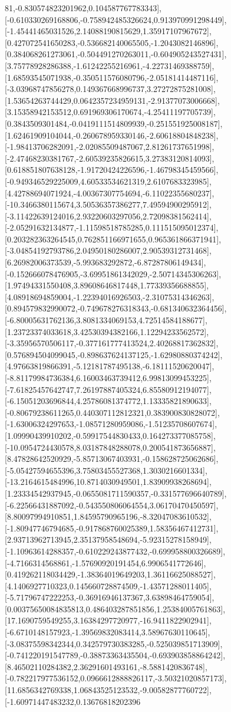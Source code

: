 \documentclass{article}
\begin{document}
81,-0.830574823201962,0.104587767783343],[-0.610330269168806,-0.758942485326624,0.913970991298449],[-1.45441465031526,2.14088190815629,1.35917107967672],[0.427072541650283,-0.536682140065505,-1.2043082146896],[0.384068261273061,-0.504491270263011,-0.604905243527431],[3.75778928286388,-1.61242255216961,-4.22731469388759],[1.68593545071938,-0.350511576080796,-2.05181414487116],[-3.03968747856278,0.149367668996737,3.27272875281008],[1.53654263744429,0.0642357234959131,-2.91377073006668],[3.15358942153512,0.691969306170674,-4.25411197705739],[0.3843509301484,-0.0419111514809939,-0.251551925008187],[1.62461909104044,-0.260678959330146,-2.60618804848238],[-1.98413706282091,-2.02085509487067,2.81261737651998],[-2.47468230381767,-2.60539235826615,3.27383120814093],[0.618851807638128,-1.91720424226596,-1.46798345459566],[-0.949346529225009,4.60533534621319,2.6107683323985],[4.42788694071924,-4.00367307754694,-6.11022355680237],[-10.3466380115674,3.50536357386277,7.49594900295912],[-3.11422639124016,2.93220603297056,2.72098381562414],[-2.05291632134877,-1.11598518785285,0.111515095012374],[0.203282363264545,0.762851166971655,0.965361866371941],[-3.04854192793786,2.04950180286007,2.90539312731468],[6.26982006373539,-5.993683292872,-6.87287806149434],[-0.152666078476905,-3.69951861342029,-2.50714345306263],[1.97494331550408,3.89608646817448,1.77339356688855],[4.08918694859004,-1.22394016926503,-2.31075314346263],[0.894579832990072,-0.749678276318343,-0.681340632364456],[-6.80005631762136,3.8081334069153,4.72514584188677],[1.23723374033618,3.42530394382166,1.12294233562572],[-3.35956570506117,-0.377161777413524,2.40268817362832],[0.576894504099045,-0.898637624137125,-1.62980880374242],[4.97663819866391,-5.12181787495138,-6.18111520620047],[-8.81179984736384,6.16003463739412,6.99813099453225],[-7.61825457642747,7.26197887405324,6.85580912194077],[-6.15051203696844,4.25786081374772,1.13335821890633],[-0.80679238611265,0.440307112812321,0.383900830828072],[-1.63006324297653,-1.08571280959086,-1.51235708607674],[1.09990439910202,-0.59917544830433,0.164273377085758],[-10.0954724430578,8.03187848288078,0.200541873656887],[8.47828642520929,-5.85713067403931,-0.158628725062686],[-5.05427594655396,3.75803455527368,1.3030216601334],[-13.2164615484996,10.8714030949501,1.83909938268694],[1.23334542937945,-0.0655081711590357,-0.331577696640789],[-6.22566431887092,-0.543550806064554,3.06170470450597],[8.80097994910851,1.84595790965196,-8.32047083610532],[-1.80947746794685,-0.917868760025389,1.58356467412731],[2.93713962713945,2.35137958548694,-5.92315278158949],[-1.10963614288357,-0.610229243877432,-0.699958800326689],[-4.7166314568861,-1.57690920191454,6.9906541772646],[0.419262118034429,-1.38364019649203,1.36116625088527],[4.1406927710323,0.145660728874509,-1.43571288011405],[-5.71796747222253,-0.36916946137367,3.63898464759054],[0.00375650084835813,0.486403287851856,1.25384005761863],[17.1690759549255,3.16384297720977,-16.9411822902941],[-6.6710148157923,-1.39569832083414,3.58967630110645],[-3.08375598342344,0.342579730383285,-0.525039851713909],[-0.741220191547789,-0.38873363435504,-0.693903858864242],[8.46502110284382,2.36291601493161,-8.5881420836748],[-0.782217977536152,0.0966612888826117,-3.50321020857173],[11.6856342769338,1.06843525123532,-9.00582877760722],[-1.60971447483232,0.13676818202396
\end{document}
